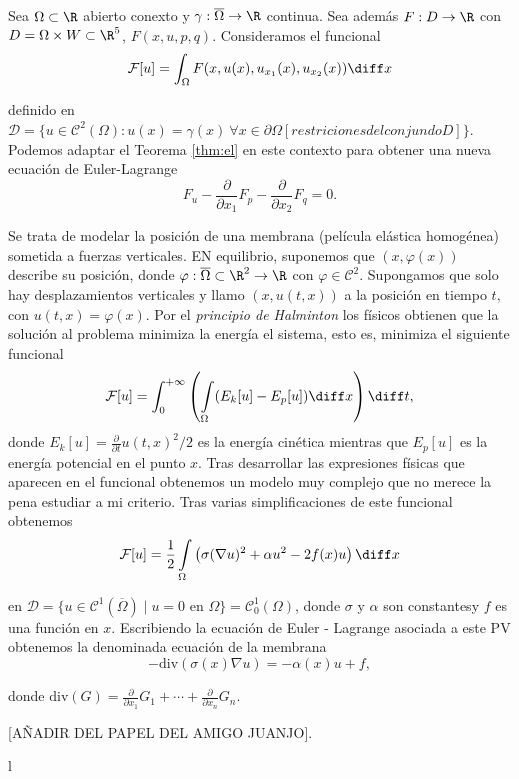 \documentclass{article}
\begin{document}
  Sea $\Omega \subset \R$ abierto conexto y $\gamma : \overline{\Omega} \to \R$ continua. Sea además
  $F : D \to \R$ con $D = \Omega \times W \subset \R^5$, $F(x,u,p,q)$. Consideramos el funcional
  \[\mathcal{F}[u] = \int_{\Omega} F(x, u(x), u_{x_1}(x), u_{x_2}(x)) \diff x\]

  definido en
  $\mathcal{D} = \{u \in \mathcal{C}^{2}(\Omega): u(x) = \gamma(x) \ \forall x\in\partial\Omega
  [restriciones del conjundo D]\}$. Podemos adaptar el Teorema \ref{thm:el} en este contexto para
  obtener una nueva ecuación de Euler-Lagrange
  \begin{equation}
    \label{eq:el:general}
    F_u - \frac{\partial}{\partial x_1} F_p - \frac{\partial}{\partial x_2} F_q = 0.
  \end{equation}

\begin{ex} \label{ex:membrana}
  Se trata de modelar la posición de una membrana (película elástica homogénea) sometida a fuerzas
  verticales. EN equilibrio, suponemos que $(x,\varphi(x))$ describe su posición, donde
  $\varphi: \overline{\Omega} \subset \R^2 \to \R$ con $\varphi \in \mathcal{C}^2$. Supongamos que
  solo hay desplazamientos verticales y llamo $(x, u(t,x))$ a la posición en tiempo $t$, con
  $u(t,x) = \varphi(x)$. Por el \emph{principio de Halminton} los físicos obtienen que la solución
  al problema minimiza la energía el sistema, esto es, minimiza el siguiente funcional
  \[ \mathcal{F}[u] = \int_{0}^{+\infty}\left(\int\limits_{\Omega} (E_k[u] - E_p[u]) \diff x
    \right)\diff t, \] donde $E_k[u] = \frac{\partial}{\partial t} u(t,x)^2/ 2$ es la energía
  cinética mientras que $E_p[u]$ es la energía potencial en el punto $x$. Tras desarrollar las
  expresiones físicas que aparecen en el funcional obtenemos un modelo muy complejo que no merece la
  pena estudiar a mi criterio. Tras varias simplificaciones de este funcional obtenemos
  \[ \mathcal{F}[u] = \frac{1}{2} \int\limits_{\Omega} \left(\sigma (\nabla u)^2 + \alpha u^2 -
    2f(x) u \right) \diff x \]

  en $\mathcal{D} = \{u \in \mathcal{C}^1(\overline{\Omega}) \mid u = 0 \text{ en } \Omega\} =
  \mathcal{C}_0^1(\Omega)$, donde $\sigma$ y $\alpha$ son constantesy $f$ es una función en
  $x$. Escribiendo la ecuación de Euler - Lagrange asociada a este PV obtenemos la denominada ecuación
  de la membrana
  \[ -\mathrm{div}(\sigma(x)\nabla u) = - \alpha(x)u + f, \]

  donde $\mathrm{div}(G) = \frac{\partial}{\partial x_{1}} G_1 + \cdots + \frac{\partial}{\partial x_{n}} G_n$.

  [AÑADIR DEL PAPEL DEL AMIGO JUANJO].
\end{ex}
l
\end{document}
